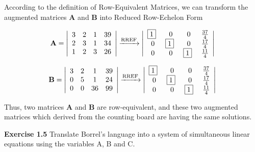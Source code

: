 \documentclass[11pt]{article}
\newcommand{\A} {
\mathbf{A}
}
\newcommand{\B} {
\mathbf{B}
}
\newcommand{\RREF} {Reduced Row-Echelon Form}
\newcommand{\REMM} {Row-Equivalent Matrices}
\begin{document}
According to the definition of \REMM,
we can transform the augmented matrices \(\A\) and \(\B\) into \RREF

\[
\A=
\left|
  \begin{array}{cccc}
    3 & 2 & 1 & 39 \\
    2 & 3 & 1 & 34 \\
    1 & 2 & 3 & 26 \\
  \end{array}
\right|
\xrightarrow[]{\text{RREF}}
\left|
\begin{array}{cccc}
  	$\boxed{1}$~ & 0 & 0 & \frac{37}{4} \\
    0 & $\boxed{1}$~ & 0 & \frac{17}{4} \\
    0 & 0 & $\boxed{1}$~ & \frac{11}{4} \\
  \end{array}
\right|
\]

\[
\B=
\left|
  \begin{array}{cccc}
    3 & 2 & 1 & 39 \\
    0 & 5 & 1 & 24 \\
    0 & 0 & 36 & 99 \\
  \end{array}
\right|
\xrightarrow[]{\text{RREF}}
\left|
\begin{array}{cccc}
  	$\boxed{1}$~ & 0 & 0 & \frac{37}{4} \\
    0 & $\boxed{1}$~ & 0 & \frac{17}{4} \\
    0 & 0 & $\boxed{1}$~ & \frac{11}{4} \\
  \end{array}
\right|
\]

Thus, two matrices \(\A\) and \(\B\) are row-equivalent,
and these two augmented matrices which derived from the counting board are having the same solutions.

\bigskip

\noindent\textbf{Exercise 1.5} Translate Borrel's language into a system of
simultaneous linear equations using the variables A, B and C.

\bigskip
\end{document}
